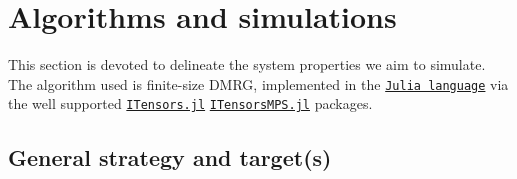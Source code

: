 \clearpage
\section{Algorithms and simulations}

This section is devoted to delineate the system properties we aim to simulate. The algorithm used is finite-size DMRG, implemented in the \href{https://docs.julialang.org/en/}{\texttt{Julia language}} via the well supported \href{https://itensor.github.io/ITensors.jl/stable/index.html}{\texttt{ITensors.jl}} \href{https://itensor.github.io/ITensorMPS.jl/stable/}{\texttt{ITensorsMPS.jl}} packages.

\subsection{General strategy and target(s)}

